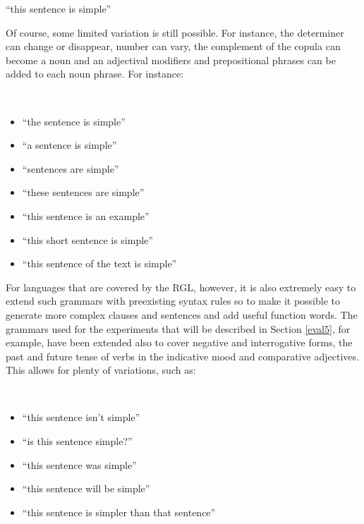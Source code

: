 \begin{example}
    ``this sentence is simple''
\end{example}

Of course, some limited variation is still possible. For instance, the determiner can change or disappear, number can vary, the complement of the copula can become a noun and an adjectival modifiers and prepositional phrases can be added to each noun phrase. For instance:

\begin{example} \ 
    \begin{itemize}
        \item ``the sentence is simple''
        \item ``a sentence is simple''
        \item ``sentences are simple''
        \item ``these sentences are simple''
        \item ``this sentence is an example''
        \item ``this short sentence is simple''
        \item ``this sentence of the text is simple''
    \end{itemize}
\end{example}

For languages that are covered by the RGL, however, it is also extremely easy to extend such grammars with preexisting syntax rules so to make it possible to generate more complex clauses and sentences and add useful function words. The grammars used for the experiments that will be described in Section \ref{eval5}, for example, have been extended also to cover negative and interrogative forms, the past and future tense of verbs in the indicative mood and comparative adjectives. This allows for plenty of variations, such as:

\begin{example} \
    \begin{itemize}
        \item ``this sentence isn't simple''
        \item ``is this sentence simple?''
        \item ``this sentence was simple''
        \item ``this sentence will be simple''
        \item ``this sentence is simpler than that sentence''
    \end{itemize}
\end{example}

